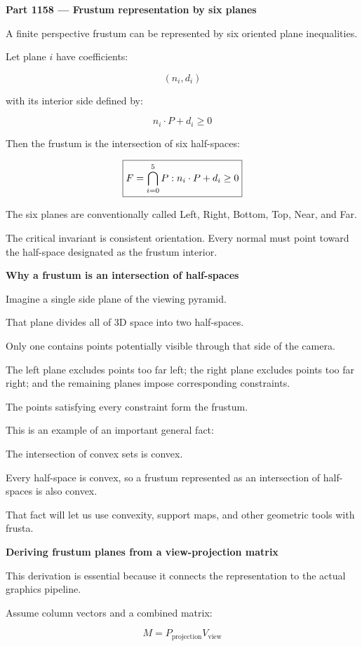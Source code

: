 \textbf{Part 1158 --- Frustum representation by six planes}

A finite perspective frustum can be represented by six oriented plane inequalities.

Let plane \(i\) have coefficients:

\[
(n_i,d_i)
\]

with its interior side defined by:

\[
n_i\cdot P+d_i\ge0
\]

Then the frustum is the intersection of six half-spaces:

\[
\boxed{ F=\bigcap_{i=0}^{5} \\{P:n_i\cdot P+d_i\ge0\\} }
\]

The six planes are conventionally called Left, Right, Bottom, Top, Near, and Far.

The critical invariant is consistent orientation. Every normal must point toward the half-space designated as the frustum interior.

\textbf{Why a frustum is an intersection of half-spaces}

Imagine a single side plane of the viewing pyramid.

That plane divides all of 3D space into two half-spaces.

Only one contains points potentially visible through that side of the camera.

The left plane excludes points too far left; the right plane excludes points too far right; and the remaining planes impose corresponding constraints.

The points satisfying every constraint form the frustum.

This is an example of an important general fact:

The intersection of convex sets is convex.

Every half-space is convex, so a frustum represented as an intersection of half-spaces is also convex.

That fact will let us use convexity, support maps, and other geometric tools with frusta.

\textbf{Deriving frustum planes from a view-projection matrix}

This derivation is essential because it connects the representation to the actual graphics pipeline.

Assume column vectors and a combined matrix:

\[
M=P_{\mathrm{projection}}V_{\mathrm{view}}
\]

